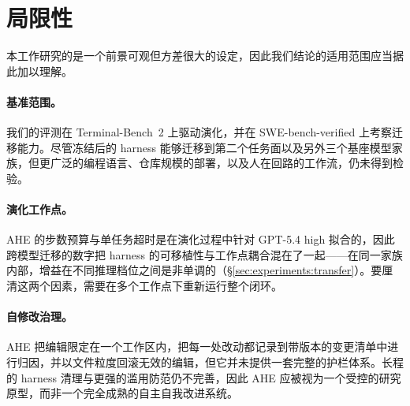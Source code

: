 \section*{局限性}
\label{sec:limitations}

本工作研究的是一个前景可观但方差很大的设定，因此我们结论的适用范围应当据此加以理解。


\paragraph{基准范围。}
我们的评测在 Terminal-Bench~2 上驱动演化，并在 SWE-bench-verified 上考察迁移能力。尽管冻结后的 harness 能够迁移到第二个任务面以及另外三个基座模型家族，但更广泛的编程语言、仓库规模的部署，以及人在回路的工作流，仍未得到检验。

\paragraph{演化工作点。}
AHE 的步数预算与单任务超时是在演化过程中针对 GPT-5.4 high 拟合的，因此跨模型迁移的数字把 harness 的可移植性与工作点耦合混在了一起——在同一家族内部，增益在不同推理档位之间是非单调的（\S\ref{sec:experiments:transfer}）。要厘清这两个因素，需要在多个工作点下重新运行整个闭环。


\paragraph{自修改治理。}
AHE 把编辑限定在一个工作区内，把每一处改动都记录到带版本的变更清单中进行归因，并以文件粒度回滚无效的编辑，但它并未提供一套完整的护栏体系。长程的 harness 清理与更强的滥用防范仍不完善，因此 AHE 应被视为一个受控的研究原型，而非一个完全成熟的自主自我改进系统。
